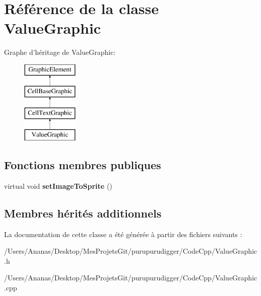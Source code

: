 \hypertarget{class_value_graphic}{\section{Référence de la classe Value\-Graphic}
\label{class_value_graphic}
}
Graphe d'héritage de Value\-Graphic\-:\begin{figure}[H]
\begin{center}
\leavevmode
\includegraphics[height=4.000000cm]{class_value_graphic}
\end{center}
\end{figure}
\subsection*{Fonctions membres publiques}
\begin{DoxyCompactItemize}
\item 
\hypertarget{class_value_graphic_ae6fff32502bd90dce5f870fdf644ff1b}{virtual void {\bfseries set\-Image\-To\-Sprite} ()}\label{class_value_graphic_ae6fff32502bd90dce5f870fdf644ff1b}

\end{DoxyCompactItemize}
\subsection*{Membres hérités additionnels}


La documentation de cette classe a été générée à partir des fichiers suivants \-:\begin{DoxyCompactItemize}
\item 
/\-Users/\-Ananas/\-Desktop/\-Mes\-Projets\-Git/purupurudigger/\-Code\-Cpp/Value\-Graphic.\-h\item 
/\-Users/\-Ananas/\-Desktop/\-Mes\-Projets\-Git/purupurudigger/\-Code\-Cpp/Value\-Graphic.\-cpp\end{DoxyCompactItemize}
